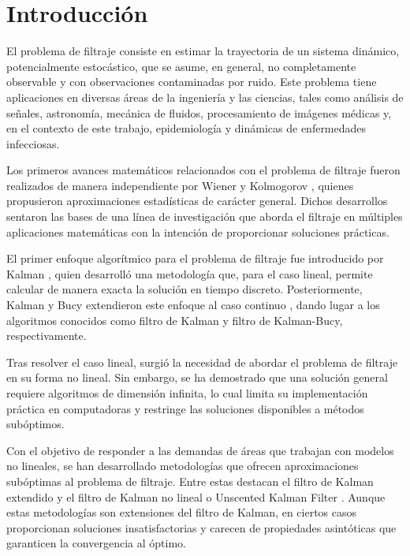\section{Introducción}

El problema de filtraje consiste en estimar la trayectoria de un sistema dinámico, potencialmente estocástico, que se asume, en general, no completamente observable y con observaciones contaminadas por ruido. Este problema tiene aplicaciones en diversas áreas de la ingeniería y las ciencias, tales como análisis de señales, astronomía, mecánica de fluidos, procesamiento de imágenes médicas y, en el contexto de este trabajo, epidemiología y dinámicas de enfermedades infecciosas.

Los primeros avances matemáticos relacionados con el problema de filtraje fueron realizados de manera independiente por Wiener \cite{Wiener1949ExtrapolationSeries, M.1950TheApplications.} y Kolmogorov \cite{Kolmogorov1940StationarySpace}, quienes propusieron aproximaciones estadísticas de carácter general. Dichos desarrollos sentaron las bases de una línea de investigación que aborda el filtraje en múltiples aplicaciones matemáticas con la intención de proporcionar soluciones prácticas.

El primer enfoque algorítmico para el problema de filtraje fue introducido por Kalman \cite{Kalman1960AProblems}, quien desarrolló una metodología que, para el caso lineal, permite calcular de manera exacta la solución en tiempo discreto. Posteriormente, Kalman y Bucy extendieron este enfoque al caso continuo \cite{Kalman1961NewTheory}, dando lugar a los algoritmos conocidos como filtro de Kalman y filtro de Kalman-Bucy, respectivamente.

Tras resolver el caso lineal, surgió la necesidad de abordar el problema de filtraje en su forma no lineal. Sin embargo, se ha demostrado que una solución general requiere algoritmos de dimensión infinita, lo cual limita su implementación práctica en computadoras y restringe las soluciones disponibles a métodos subóptimos.

Con el objetivo de responder a las demandas de áreas que trabajan con modelos no lineales, se han desarrollado metodologías que ofrecen aproximaciones subóptimas al problema de filtraje. Entre estas destacan el filtro de Kalman extendido \cite{Smith1962ApplicationVehicle, McElhoe1966AnVenus} y el filtro de Kalman no lineal o Unscented Kalman Filter \cite{Julier2004UnscentedEstimation}. Aunque estas metodologías son extensiones del filtro de Kalman, en ciertos casos proporcionan soluciones insatisfactorias y carecen de propiedades asintóticas que garanticen la convergencia al óptimo.


